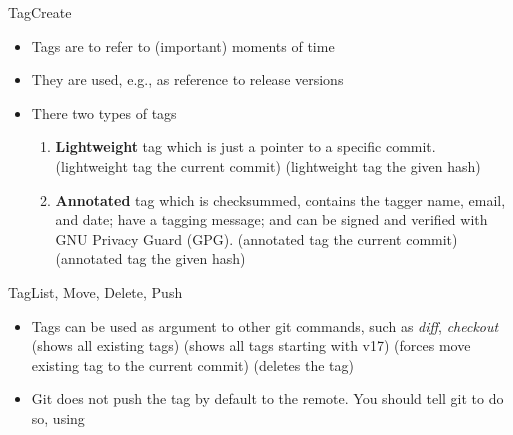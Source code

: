\begin{frame}{Tag}{Create}
\begin{itemize}
  \item Tags are to refer to (important) moments of time
  \item They are used, e.g., as reference to release versions
\item There two types of tags
\begin{enumerate}
  \item \textbf{Lightweight} tag which is just a pointer to a specific commit.
     (lightweight tag the current commit)
     (lightweight tag the given hash)
  \item \textbf{Annotated} tag which is checksummed, contains the tagger name, email, and date; have a tagging message; and can be signed and verified with GNU Privacy Guard (GPG).
     (annotated tag the current commit)
     (annotated tag the given hash)
\end{enumerate}
\end{itemize}
\end{frame}

\begin{frame}{Tag}{List, Move, Delete, Push}
\begin{itemize}
\item Tags can be used as argument to other git commands,
  such as \emph{diff}, \emph{checkout}
     (shows all existing tags)
     (shows all tags starting with v17)
     (forces move existing tag to the current commit)
     (deletes the tag)
  \item Git does not push the tag by default to the remote. You should tell
    git to do so, using
\end{itemize}
\end{frame}
